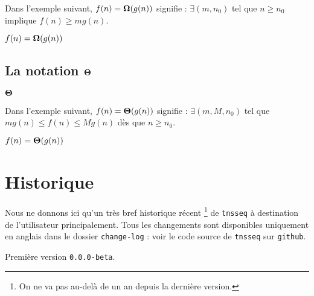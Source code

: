 \documentclass[12pt,a4paper]{article}
\makeatletter
\theoremstyle{definition}
\newcounter{paraexample}[subsubsection]
\newcommand\@newexample@abstract[2]{%
	\paragraph{%
		#1%
		\if\relax\detokenize{#2}\relax\else {} -- #2\fi%
	}%
}
\newcommand\newparaexample{\@ifstar{\@newparaexample@star}{\@newparaexample@no@star}}
\newcommand\@newparaexample@no@star[1]{%
	\refstepcounter{paraexample}%
	\@newexample@abstract{Exemple \theparaexample}{#1}%
}
\newcommand\@newparaexample@star[1]{%
	\@newexample@abstract{Exemple}{#1}%
}
\makeatother
\begin{document}


\newparaexample{}

Dans l'exemple suivant, $f(n) = \bigomega{g(n)}$ signifie :
$\exists (m, n_0)$ tel que $n \geq n_0$ implique $f(n) \geq m g(n)$.

\begin{latexex}
$f(n) = \bigomega{g(n)}$
\end{latexex}




\subsection{\texorpdfstring{La notation $\bigtheta{}$}%
                           {La notation "grand Theta"}}

\newparaexample{}

\begin{latexex}
$\bigtheta{}$
\end{latexex}




\newparaexample{}

Dans l'exemple suivant, $f(n) = \bigtheta{g(n)}$ signifie : $\exists (m, M, n_0)$ tel que $m g(n) \leq f(n) \leq M g(n)$ dès que $n \geq n_0$.

\begin{latexex}
$f(n) = \bigtheta{g(n)}$
\end{latexex}


\newpage

\section{Historique}

Nous ne donnons ici qu'un très bref historique récent
\footnote{
	On ne va pas au-delà de un an depuis la dernière version.
}
de \verb+tnsseq+ à destination de l'utilisateur principalement.
Tous les changements sont disponibles uniquement en anglais dans le dossier \verb+change-log+ : voir le code source de \verb+tnsseq+ sur \verb+github+.

\begin{description}

    \medskip
    \item[2020-07-10] Première version \verb+0.0.0-beta+.

\end{description}
\end{document}
